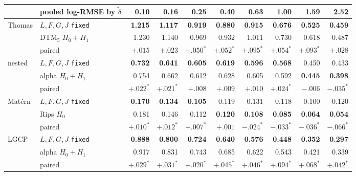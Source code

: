 \documentclass[11pt]{article}
\newcommand{\dt}{\tilde\delta}
\begin{document}
\smallskip
{\small
\begin{tabular}{@{}llrrrrrrrr@{}}
\toprule
 & pooled log-RMSE by $\dt$ & 0.10 & 0.16 & 0.25 & 0.40 & 0.63 & 1.00 & 1.59 & 2.52 \\
\midrule
Thomas   & $L,F,G,J$ \texttt{fixed}      & \textbf{1.215} & \textbf{1.117} & \textbf{0.919} & \textbf{0.880} & \textbf{0.915} & \textbf{0.676} & \textbf{0.525} & \textbf{0.459} \\
         & DTM$_5$ $H_0{+}H_1$           & 1.230 & 1.140 & 0.969 & 0.932 & 1.011 & 0.730 & 0.618 & 0.487 \\
         & \quad paired                  & $+.015$ & $+.023$ & $+.050^\ast$ & $+.052^\ast$ & $+.095^\ast$ & $+.054^\ast$ & $+.093^\ast$ & $+.028$ \\
\addlinespace
nested   & $L,F,G,J$ \texttt{fixed}      & \textbf{0.732} & \textbf{0.641} & \textbf{0.605} & \textbf{0.619} & \textbf{0.596} & \textbf{0.568} & 0.450 & 0.433 \\
         & alpha $H_0{+}H_1$             & 0.754 & 0.662 & 0.612 & 0.628 & 0.605 & 0.592 & \textbf{0.445} & \textbf{0.398} \\
         & \quad paired                  & $+.022^\ast$ & $+.021^\ast$ & $+.008$ & $+.009$ & $+.010$ & $+.024^\ast$ & $-.006$ & $-.035^\ast$ \\
\addlinespace
Mat\'ern & $L,F,G,J$ \texttt{fixed}      & \textbf{0.170} & \textbf{0.134} & \textbf{0.105} & 0.119 & 0.131 & 0.118 & 0.100 & 0.120 \\
         & Rips $H_0$                    & 0.181 & 0.146 & 0.112 & \textbf{0.120} & \textbf{0.108} & \textbf{0.085} & \textbf{0.064} & \textbf{0.054} \\
         & \quad paired                  & $+.010^\ast$ & $+.012^\ast$ & $+.007^\ast$ & $+.001$ & $-.024^\ast$ & $-.033^\ast$ & $-.036^\ast$ & $-.066^\ast$ \\
\addlinespace
LGCP     & $L,F,G,J$ \texttt{fixed}      & \textbf{0.888} & \textbf{0.800} & \textbf{0.724} & \textbf{0.640} & \textbf{0.576} & \textbf{0.448} & \textbf{0.352} & \textbf{0.297} \\
         & alpha $H_0{+}H_1$             & 0.917 & 0.831 & 0.743 & 0.685 & 0.622 & 0.543 & 0.421 & 0.339 \\
         & \quad paired                  & $+.029^\ast$ & $+.031^\ast$ & $+.020^\ast$ & $+.045^\ast$ & $+.046^\ast$ & $+.094^\ast$ & $+.068^\ast$ & $+.042^\ast$ \\
\bottomrule
\end{tabular}
}
\end{document}
